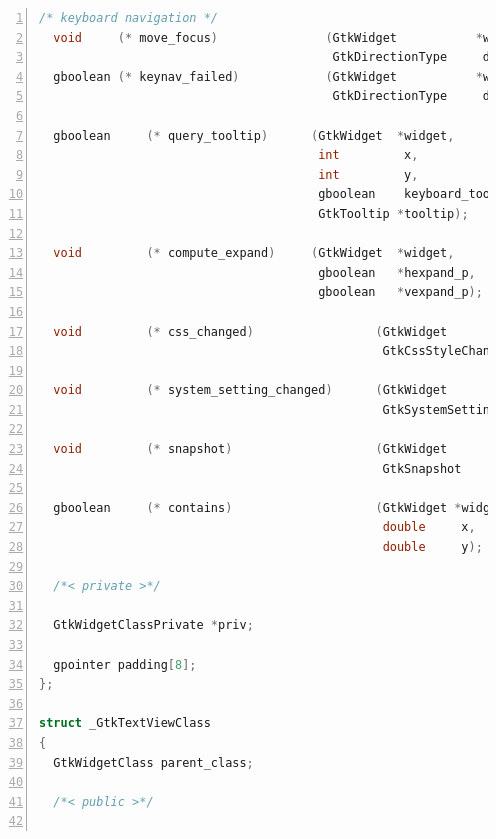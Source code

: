 \begin{lstlisting}[language=C, numbers=left]
  /* keyboard navigation */
  void     (* move_focus)               (GtkWidget           *widget,
                                         GtkDirectionType     direction);
  gboolean (* keynav_failed)            (GtkWidget           *widget,
                                         GtkDirectionType     direction);

  gboolean     (* query_tooltip)      (GtkWidget  *widget,
                                       int         x,
                                       int         y,
                                       gboolean    keyboard_tooltip,
                                       GtkTooltip *tooltip);

  void         (* compute_expand)     (GtkWidget  *widget,
                                       gboolean   *hexpand_p,
                                       gboolean   *vexpand_p);

  void         (* css_changed)                 (GtkWidget            *widget,
                                                GtkCssStyleChange    *change);

  void         (* system_setting_changed)      (GtkWidget            *widget,
                                                GtkSystemSetting      settings);

  void         (* snapshot)                    (GtkWidget            *widget,
                                                GtkSnapshot          *snapshot);

  gboolean     (* contains)                    (GtkWidget *widget,
                                                double     x,
                                                double     y);

  /*< private >*/

  GtkWidgetClassPrivate *priv;

  gpointer padding[8];
};

struct _GtkTextViewClass
{
  GtkWidgetClass parent_class;

  /*< public >*/


\end{lstlisting}
